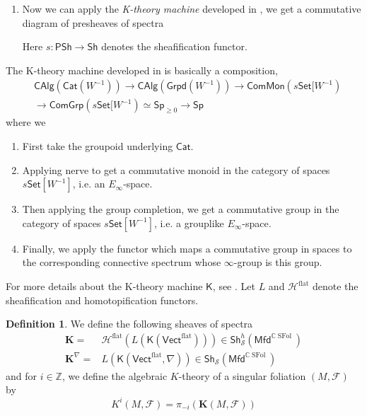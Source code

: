 \documentclass[12pt]{amsart}
\theoremstyle{definition}
\newtheorem{defn}[thm]{Definition}
\theoremstyle{remark}
\numberwithin{equation}{section}
\newcommand{\CF}{{\mathcal F}}
\newcommand{\Z}{{\mathbb{Z}}}
\newcommand{\C}{{\mathbb{C}}}
\newcommand{\1}{{\mathbb{1}}}
\newcommand{\set}{\mathsf{Set}}
\newcommand{\mfd}{\mathsf{Mfd}}
\newcommand{\comgrp}{\mathsf{ComGrp}}
\newcommand{\common}{\mathsf{ComMon}}
\newcommand{\gpd}{\mathsf{Grpd}}
\newcommand{\calg}{\mathsf{CAlg}}
\newcommand{\sfol}{{\operatorname{SFol}}}
\newcommand{\Flat}{{\operatorname{flat}}}
\newcommand{\sh}{\mathsf{Sh}}
\newcommand{\psh}{\mathsf{PSh}}
\newcommand{\Sp}{{\mathcal{S}}}
\newcommand{\cat}{\mathsf{Cat}}
\newcommand{\ku}{\mathsf{ku}}
\newcommand{\vect}{\mathsf{Vect}}
\begin{document}
\begin{enumerate}
\item Now we can apply the {\it  K-theory machine} developed in \cite{BNV13}, we get a commutative diagram of presheaves of spectra
\begin{center}
\end{center}
 Here $s:\psh \to \sh$ denotes the sheafification functor.
\end{enumerate}
The K-theory machine developed in \cite{BNV13} is basically a composition,
\begin{align*}
    &\calg(\cat(W^{-1})) \to \calg(\gpd(W^{-1})) \to \common(s\set[W^{-1}) \\
    &\to \comgrp(s\set[W^{-1}) \simeq \mathsf{Sp}_{\ge 0} \to \mathsf{Sp}
\end{align*}
where we \begin{enumerate}
    \item First take the groupoid underlying $\cat$.
    \item Applying nerve to get a commutative monoid in the category of spaces $s\set[W^{-1}]$, i.e. an $E_{\infty}$-space.
    \item Then applying the group completion, we get a commutative group in the category of spaces $s\set[W^{-1}]$, i.e. a grouplike $E_{\infty}$-space.
    \item Finally, we apply the functor which maps a commutative group in spaces to the corresponding connective spectrum whose $\infty$-group is this group.
\end{enumerate}
For more details about the K-theory machine $\mathsf{K}$, see \cite[Definition 6.1, Remark 6.4]{BNV13}. 
Let $L$ and $\mathcal{H}^{\Flat}$ denote the sheafification and homotopification functors.
\begin{defn}
    We define the following sheaves of spectra 
    \begin{align*}
        \mathbf{K} =& \mathcal{H}^{\Flat}(L(\mathsf{K}(\vect^{\Flat}))) \in \sh_{\Sp}^h(\mfd^{{\C}\sfol})\\
        \mathbf{K}^{\nabla} =& L(\mathsf{K}(\vect^{\Flat}, \nabla)) \in \sh_{\Sp}(\mfd^{{\C}\sfol})
    \end{align*}
    and for $i\in \Z$, we define the algebraic $K$-theory of a singular foliation $(M, \CF)$  by
    \begin{equation*}
        K^i(M,\CF) = \pi_{-i}(\mathbf{K}(M, \CF))
    \end{equation*}
\end{defn}
\end{document}
